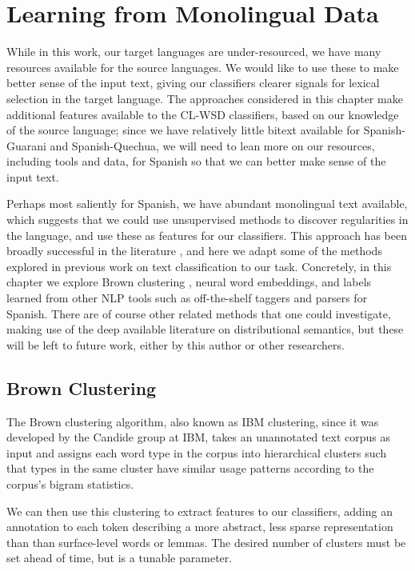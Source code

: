 \chapter{Learning from Monolingual Data}
\label{chap:monolingual}
While in this work, our target languages are under-resourced, we have many
resources available for the source languages. We would like to use these to
make better sense of the input text, giving our classifiers clearer signals for
lexical selection in the target language.
The approaches considered in this chapter make additional features available to
the CL-WSD classifiers, based on our knowledge of the source language;
since we have relatively little bitext available for Spanish-Guarani
and Spanish-Quechua, we will need to lean more on our resources, including
tools and data, for Spanish so that we can better make sense of the input text.

Perhaps most saliently for Spanish, we have abundant monolingual text
available, which suggests that we could use unsupervised methods to discover
regularities in the language, and use these as features for our classifiers.
This approach has been broadly successful in the literature
\cite{turian-ratinov-bengio:2010:ACL}
, and here we adapt some of the methods explored in previous work on text
classification to our task. Concretely, in this chapter we explore
Brown clustering \cite{brown1992class}, neural word embeddings, and labels
learned from other NLP tools such as off-the-shelf taggers and parsers for
Spanish. There are of course other related methods that one could investigate,
making use of the deep available literature on distributional semantics, but
these will be left to future work, either by this author or other researchers.

\section{Brown Clustering}
The Brown clustering algorithm, also known as IBM clustering, since it was
developed by the Candide group at IBM, takes an unannotated text corpus as
input and assigns each word type in the corpus into hierarchical clusters such
that types in the same cluster have similar usage patterns according to the
corpus's bigram statistics.

We can then use this clustering to extract features to our classifiers, adding
an annotation to each token describing a more abstract, less sparse
representation than than surface-level words or lemmas. The desired
number of clusters must be set ahead of time, but is a tunable parameter.

